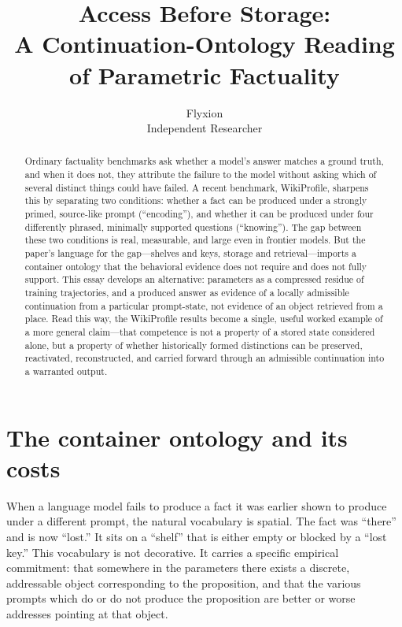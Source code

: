 \documentclass[11pt]{article}
\title{\bfseries Access Before Storage: \\ A Continuation-Ontology Reading of Parametric Factuality}
\author{Flyxion \\ \small Independent Researcher}
\date{}
\begin{document}
\maketitle

\begin{abstract}
\noindent Ordinary factuality benchmarks ask whether a model's answer matches a ground truth, and when it does not, they attribute the failure to the model without asking which of several distinct things could have failed. A recent benchmark, WikiProfile, sharpens this by separating two conditions: whether a fact can be produced under a strongly primed, source-like prompt (``encoding''), and whether it can be produced under four differently phrased, minimally supported questions (``knowing''). The gap between these two conditions is real, measurable, and large even in frontier models. But the paper's language for the gap---shelves and keys, storage and retrieval---imports a container ontology that the behavioral evidence does not require and does not fully support. This essay develops an alternative: parameters as a compressed residue of training trajectories, and a produced answer as evidence of a locally admissible continuation from a particular prompt-state, not evidence of an object retrieved from a place. Read this way, the WikiProfile results become a single, useful worked example of a more general claim---that competence is not a property of a stored state considered alone, but a property of whether historically formed distinctions can be preserved, reactivated, reconstructed, and carried forward through an admissible continuation into a warranted output.
\end{abstract}

\section{The container ontology and its costs}

When a language model fails to produce a fact it was earlier shown to produce under a different prompt, the natural vocabulary is spatial. The fact was ``there'' and is now ``lost.'' It sits on a ``shelf'' that is either empty or blocked by a ``lost key.'' This vocabulary is not decorative. It carries a specific empirical commitment: that somewhere in the parameters there exists a discrete, addressable object corresponding to the proposition, and that the various prompts which do or do not produce the proposition are better or worse addresses pointing at that object.
\end{document}
